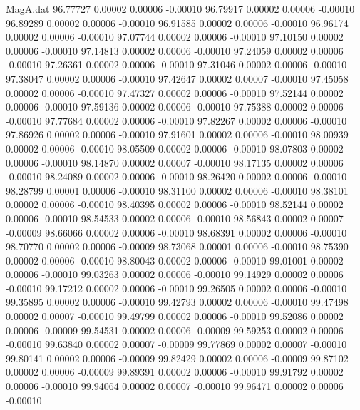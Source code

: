 \begin{filecontents}{MagA.dat}
  96.77727    0.00002    0.00006   -0.00010
  96.79917    0.00002    0.00006   -0.00010
  96.89289    0.00002    0.00006   -0.00010
  96.91585    0.00002    0.00006   -0.00010
  96.96174    0.00002    0.00006   -0.00010
  97.07744    0.00002    0.00006   -0.00010
  97.10150    0.00002    0.00006   -0.00010
  97.14813    0.00002    0.00006   -0.00010
  97.24059    0.00002    0.00006   -0.00010
  97.26361    0.00002    0.00006   -0.00010
  97.31046    0.00002    0.00006   -0.00010
  97.38047    0.00002    0.00006   -0.00010
  97.42647    0.00002    0.00007   -0.00010
  97.45058    0.00002    0.00006   -0.00010
  97.47327    0.00002    0.00006   -0.00010
  97.52144    0.00002    0.00006   -0.00010
  97.59136    0.00002    0.00006   -0.00010
  97.75388    0.00002    0.00006   -0.00010
  97.77684    0.00002    0.00006   -0.00010
  97.82267    0.00002    0.00006   -0.00010
  97.86926    0.00002    0.00006   -0.00010
  97.91601    0.00002    0.00006   -0.00010
  98.00939    0.00002    0.00006   -0.00010
  98.05509    0.00002    0.00006   -0.00010
  98.07803    0.00002    0.00006   -0.00010
  98.14870    0.00002    0.00007   -0.00010
  98.17135    0.00002    0.00006   -0.00010
  98.24089    0.00002    0.00006   -0.00010
  98.26420    0.00002    0.00006   -0.00010
  98.28799    0.00001    0.00006   -0.00010
  98.31100    0.00002    0.00006   -0.00010
  98.38101    0.00002    0.00006   -0.00010
  98.40395    0.00002    0.00006   -0.00010
  98.52144    0.00002    0.00006   -0.00010
  98.54533    0.00002    0.00006   -0.00010
  98.56843    0.00002    0.00007   -0.00009
  98.66066    0.00002    0.00006   -0.00010
  98.68391    0.00002    0.00006   -0.00010
  98.70770    0.00002    0.00006   -0.00009
  98.73068    0.00001    0.00006   -0.00010
  98.75390    0.00002    0.00006   -0.00010
  98.80043    0.00002    0.00006   -0.00010
  99.01001    0.00002    0.00006   -0.00010
  99.03263    0.00002    0.00006   -0.00010
  99.14929    0.00002    0.00006   -0.00010
  99.17212    0.00002    0.00006   -0.00010
  99.26505    0.00002    0.00006   -0.00010
  99.35895    0.00002    0.00006   -0.00010
  99.42793    0.00002    0.00006   -0.00010
  99.47498    0.00002    0.00007   -0.00010
  99.49799    0.00002    0.00006   -0.00010
  99.52086    0.00002    0.00006   -0.00009
  99.54531    0.00002    0.00006   -0.00009
  99.59253    0.00002    0.00006   -0.00010
  99.63840    0.00002    0.00007   -0.00009
  99.77869    0.00002    0.00007   -0.00010
  99.80141    0.00002    0.00006   -0.00009
  99.82429    0.00002    0.00006   -0.00009
  99.87102    0.00002    0.00006   -0.00009
  99.89391    0.00002    0.00006   -0.00010
  99.91792    0.00002    0.00006   -0.00010
  99.94064    0.00002    0.00007   -0.00010
  99.96471    0.00002    0.00006   -0.00010
\end{filecontents}
